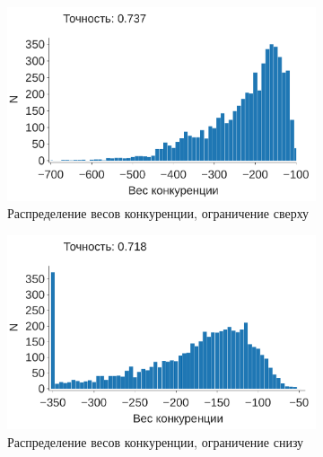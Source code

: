 \documentclass[a4paper]{article}
\begin{document}
\begin{figure}
\centering 
\begin{subfigure}{0.45\textwidth}
    \includegraphics[width=\textwidth,keepaspectratio=true]{competition_distribution_clamp_low_ru.pdf}
    \caption{Распределение весов конкуренции, ограничение сверху} 
\end{subfigure}
\begin{subfigure}{0.45\textwidth}
    \includegraphics[width=\textwidth,keepaspectratio=true]{competition_distribution_clamp_high_ru.pdf}
    \caption{Распределение весов конкуренции, ограничение снизу}
\end{subfigure}
\begin{subfigure}{0.45\textwidth}

\end{subfigure}
\end{figure}
\end{document}
